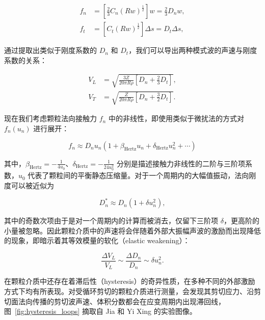 \begin{align}
  f_{n} &= \left[\frac{2}{3}C_{n}(Rw)^{\frac{1}{2}}\right]w = \frac{2}{3}D_{n}w,\\
  f_{t} &= \left[C_{t}(Rw)^{\frac{1}{2}}\right]\Delta s = D_{t}\Delta s,
\end{align}

通过提取出类似于刚度系数的 $D_{n}$ 和 $D_{t}$，我们可以导出两种模式波的声速与刚度系数的关系\cite{doi.org/10.1029/GL010i011p01073}：

\begin{align}
  V_{L} &= \sqrt{\frac{3Z}{20\pi R\rho}\left[D_{n} + \frac{2}{3}D_{t}\right]},\\
  V_{T} &= \sqrt{\frac{ Z}{20\pi R\rho}\left[D_{n} + \frac{3}{2}D_{t}\right]}.
\end{align}

现在我们考虑颗粒法向接触力 $f_{n}$ 中的非线性，即使用类似于微扰法的方式对 $f_{n}(u_{n})$ 进行展开：

\begin{equation}
  f_{n} \approx D_{n}u_{n}\left(1 + \beta_{\text{Hertz}} u_{n} + \delta_{\text{Hertz}} u_{n}^{2} + \cdots\right)
\end{equation}

其中，$\beta_{\text{Hertz}} = -\frac{1}{4u_{0}}$、$\delta_{\text{Hertz}} = -\frac{1}{24u_{0}^{2}}$ 分别是描述接触力非线性的二阶与三阶项系数，$u_{0}$ 代表了颗粒间的平衡静态压缩量。对于一个周期内的大幅值振动，法向刚度可以被近似为

\begin{equation}
  D_{n}^{*} \approx D_{n}(1 + \delta u_{n}^{2}),
\end{equation}

其中的奇数次项由于是对一个周期内的计算而被消去，仅留下三阶项 $\delta$，更高阶的小量被忽略。因此颗粒介质中的声速将会伴随着外部大振幅声波的激励而出现降低的现象，即暗示着其等效模量的软化（elastic weakening）\cite{PhysRevE.84.020301}：

\begin{equation}
  \frac{\Delta V_{L}}{V_{L}} \sim \frac{\Delta D_{n}}{D_{n}}\sim \delta u_{n}^{2}.
\end{equation}

在颗粒介质中还存在着滞后性（hysteresis）的奇异性质，在多种不同的外部激励方式下均有所表现。对受循环剪切的颗粒介质进行测量，会发现其剪切应力、沿剪切面法向传播的剪切波声速、体积分数都会在应变周期内出现滞回线\cite{PhysRevE.85.051302,PhysRevLett.126.048002}，图~\ref{fig:hysteresis_loops} 摘取自 Jia 和 Yi Xing 的实验图像。


